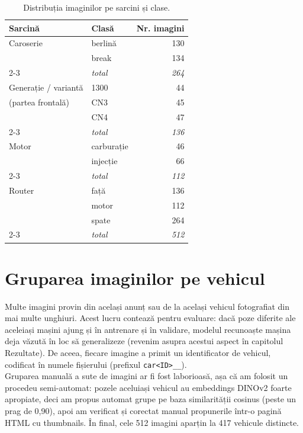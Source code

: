 \documentclass[12pt, a4paper, openany]{book}
\begin{document}
\begin{table}[H]
\centering
\caption{Distribuția imaginilor pe sarcini și clase.}
\label{tab:distributie}
\begin{tabular}{l l r}
\toprule
\textbf{Sarcină} & \textbf{Clasă} & \textbf{Nr. imagini} \\
\midrule
Caroserie & berlină & 130 \\
          & break   & 134 \\
\cmidrule(lr){2-3}
          & \textit{total} & \textit{264} \\
\midrule
Generație / variantă & 1300 & 44 \\
(partea frontală)
                     & CN3  & 45 \\
                     & CN4  & 47 \\
\cmidrule(lr){2-3}
                     & \textit{total} & \textit{136} \\
\midrule
Motor & carburație & 46 \\
      & injecție   & 66 \\
\cmidrule(lr){2-3}
      & \textit{total} & \textit{112} \\
\midrule
Router & față  & 136 \\
       & motor & 112 \\
       & spate & 264 \\
\cmidrule(lr){2-3}
       & \textit{total} & \textit{512} \\
\bottomrule
\end{tabular}
\end{table}

\section{Gruparea imaginilor pe vehicul}
\label{sec:grupare}

Multe imagini provin din același anunț sau de la același vehicul fotografiat din mai multe unghiuri. Acest lucru contează pentru evaluare: dacă poze diferite ale aceleiași mașini ajung și în antrenare și în validare, modelul recunoaște mașina deja văzută în loc să generalizeze (revenim asupra acestui aspect în capitolul Rezultate). De aceea, fiecare imagine a primit un identificator de vehicul, codificat în numele fișierului (prefixul \texttt{car<ID>\_\_}).
\\ \indent Gruparea manuală a sute de imagini ar fi fost laborioasă, așa că am folosit un procedeu semi-automat: pozele aceluiași vehicul au embeddings DINOv2 foarte apropiate, deci am propus automat grupe pe baza similarității cosinus (peste un prag de 0,90), apoi am verificat și corectat manual propunerile într-o pagină HTML cu thumbnails. În final, cele 512 imagini aparțin la 417 vehicule distincte.
\end{document}
